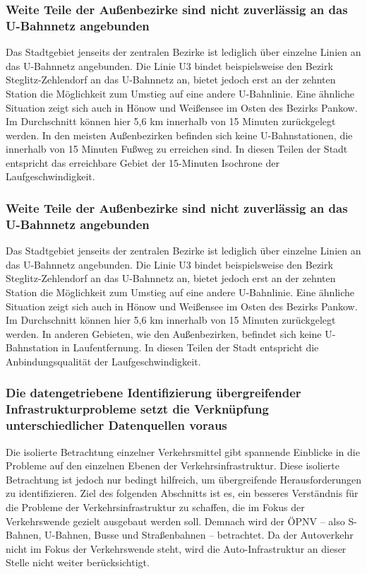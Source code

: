 \subsubsection{Weite Teile der Außenbezirke sind nicht zuverlässig an das U-Bahnnetz angebunden}
Das Stadtgebiet jenseits der zentralen Bezirke ist lediglich über einzelne Linien an das U-Bahnnetz angebunden. Die Linie U3 bindet beispielsweise den Bezirk Steglitz-Zehlendorf an das U-Bahnnetz an, bietet jedoch erst an der zehnten Station die Möglichkeit zum Umstieg auf eine andere U-Bahnlinie. Eine ähnliche Situation zeigt sich auch in Hönow und Weißensee im Osten des Bezirks Pankow. Im Durchschnitt können hier 5,6 km innerhalb von 15 Minuten zurückgelegt werden. In den meisten Außenbezirken befinden sich keine U-Bahnstationen, die innerhalb von 15 Minuten Fußweg zu erreichen sind. In diesen Teilen der Stadt entspricht das erreichbare Gebiet der 15-Minuten Isochrone der Laufgeschwindigkeit.











\subsubsection{Weite Teile der Außenbezirke sind nicht zuverlässig an das U-Bahnnetz angebunden}
Das Stadtgebiet jenseits der zentralen Bezirke ist lediglich über einzelne Linien an das U-Bahnnetz angebunden. Die Linie U3 bindet beispielsweise den Bezirk Steglitz-Zehlendorf an das U-Bahnnetz an, bietet jedoch erst an der zehnten Station die Möglichkeit zum Umstieg auf eine andere U-Bahnlinie. Eine ähnliche Situation zeigt sich auch in Hönow und Weißensee im Osten des Bezirks Pankow. Im Durchschnitt können hier 5,6 km innerhalb von 15 Minuten zurückgelegt werden. In anderen Gebieten, wie den Außenbezirken, befindet sich keine U-Bahnstation in Laufentfernung. In diesen Teilen der Stadt entspricht die Anbindungsqualität der Laufgeschwindigkeit.






\subsubsection{Die datengetriebene Identifizierung übergreifender Infrastrukturprobleme setzt die Verknüpfung unterschiedlicher Datenquellen voraus}
Die isolierte Betrachtung einzelner Verkehrsmittel gibt spannende Einblicke in die Probleme auf den einzelnen Ebenen der Verkehrsinfrastruktur. Diese isolierte Betrachtung ist jedoch nur bedingt hilfreich, um übergreifende Herausforderungen zu identifizieren. Ziel des folgenden Abschnitts ist es, ein besseres Verständnis für die Probleme der Verkehrsinfrastruktur zu schaffen, die im Fokus der Verkehrswende gezielt ausgebaut werden soll. Demnach wird der ÖPNV – also S-Bahnen, U-Bahnen, Busse und Straßenbahnen – betrachtet. Da der Autoverkehr nicht im Fokus der Verkehrswende steht, wird die Auto-Infrastruktur an dieser Stelle nicht weiter berücksichtigt.

